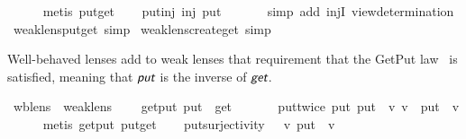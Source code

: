 \begin{isabellebody}
%
\isadelimproof
\ \ \ \ %
\endisadelimproof
%
\isatagproof
{}\isamarkupfalse%
\ {\isacharparenleft}metis\ put{\isacharunderscore}get{\isacharparenright}%
\endisatagproof
{\isafoldproof}%
%
\isadelimproof
\isanewline
%
\endisadelimproof
\isanewline
\ \ \isamarkupfalse%
\ put{\isacharunderscore}inj{\isacharcolon}\ {\isachardoublequoteopen}inj\ {\isacharparenleft}put\ {\isasymsigma}{\isacharparenright}{\isachardoublequoteclose}\isanewline
%
\isadelimproof
\ \ \ \ %
\endisadelimproof
%
\isatagproof
{}\isamarkupfalse%
\ {\isacharparenleft}simp\ add{\isacharcolon}\ injI\ view{\isacharunderscore}determination{\isacharparenright}%
\endisatagproof
{\isafoldproof}%
%
\isadelimproof
\isanewline
%
\endisadelimproof
{}\isamarkupfalse%
\isanewline
\isanewline
{}\isamarkupfalse%
\ weak{\isacharunderscore}lens{\isachardot}put{\isacharunderscore}get\ {\isacharbrackleft}simp{\isacharbrackright}\isanewline
{}\isamarkupfalse%
\ weak{\isacharunderscore}lens{\isachardot}create{\isacharunderscore}get\ {\isacharbrackleft}simp{\isacharbrackright}%
\isamarkuptrue%
%
\begin{isamarkuptext}%
Well-behaved lenses add to weak lenses that requirement that the GetPut law~\cite{Foster09,Fischer2015} 
  is satisfied, meaning that $\textit{\textsf{put}}$ is the inverse of $\textit{\textsf{get}}$.%
\end{isamarkuptext}\isamarkuptrue%
\isamarkupfalse%
\ wb{\isacharunderscore}lens\ {\isacharequal}\ weak{\isacharunderscore}lens\ {\isacharplus}\isanewline
\ \ \ get{\isacharunderscore}put{\isacharcolon}\ {\isachardoublequoteopen}put\ {\isasymsigma}\ {\isacharparenleft}get\ {\isasymsigma}{\isacharparenright}\ {\isacharequal}\ {\isasymsigma}{\isachardoublequoteclose}\isanewline
{}\isanewline
\isanewline
\ \ \isamarkupfalse%
\ put{\isacharunderscore}twice{\isacharcolon}\ {\isachardoublequoteopen}put\ {\isacharparenleft}put\ {\isasymsigma}\ v{\isacharparenright}\ v\ {\isacharequal}\ put\ {\isasymsigma}\ v{\isachardoublequoteclose}\isanewline
%
\isadelimproof
\ \ \ \ %
\endisadelimproof
%
\isatagproof
{}\isamarkupfalse%
\ {\isacharparenleft}metis\ get{\isacharunderscore}put\ put{\isacharunderscore}get{\isacharparenright}%
\endisatagproof
{\isafoldproof}%
%
\isadelimproof
\isanewline
%
\endisadelimproof
\isanewline
\ \ \isamarkupfalse%
\ put{\isacharunderscore}surjectivity{\isacharcolon}\ {\isachardoublequoteopen}{\isasymexists}\ {\isasymrho}\ v{\isachardot}\ put\ {\isasymrho}\ v\ {\isacharequal}\ {\isasymsigma}{\isachardoublequoteclose}\isanewline

\end{isabellebody}
